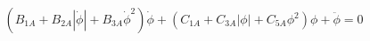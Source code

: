 \begin{equation}
\left(B_{1A} + B_{2A} \left|{\dot{\phi}}\right| + B_{3A} \dot{\phi}^{2}\right) \dot{\phi} + \left(C_{1A} + C_{3A} \left|{\phi}\right| + C_{5A} \phi^{2}\right) \phi + \ddot{\phi} = 0
\end{equation}
